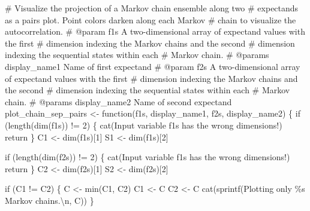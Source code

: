 \documentclass[
  letterpaper,
  DIV=11,
  numbers=noendperiod]{scrartcl}
\newenvironment{Shaded}{\begin{snugshade}}{\end{snugshade}}
\newcommand{\CommentTok}[1]{\textcolor[rgb]{0.37,0.37,0.37}{#1}}
\newcommand{\ControlFlowTok}[1]{\textcolor[rgb]{0.00,0.23,0.31}{#1}}
\newcommand{\DecValTok}[1]{\textcolor[rgb]{0.68,0.00,0.00}{#1}}
\newcommand{\FunctionTok}[1]{\textcolor[rgb]{0.28,0.35,0.67}{#1}}
\newcommand{\NormalTok}[1]{\textcolor[rgb]{0.00,0.23,0.31}{#1}}
\newcommand{\OtherTok}[1]{\textcolor[rgb]{0.00,0.23,0.31}{#1}}
\newcommand{\SpecialCharTok}[1]{\textcolor[rgb]{0.37,0.37,0.37}{#1}}
\newcommand{\StringTok}[1]{\textcolor[rgb]{0.13,0.47,0.30}{#1}}
\begin{document}
\begin{Shaded}
\begin{Highlighting}[]
\CommentTok{\# Visualize the projection of a Markov chain ensemble along two }
\CommentTok{\# expectands as a pairs plot.  Point colors darken along each Markov }
\CommentTok{\# chain to visualize the autocorrelation.}
\CommentTok{\# @param f1s A two{-}dimensional array of expectand values with the first }
\CommentTok{\#            dimension indexing the Markov chains and the second }
\CommentTok{\#            dimension indexing the sequential states  within each }
\CommentTok{\#            Markov chain.}
\CommentTok{\# @params display\_name1 Name of first expectand}
\CommentTok{\# @param f2s A two{-}dimensional array of expectand values with the first }
\CommentTok{\#            dimension indexing the Markov chains and the second }
\CommentTok{\#            dimension indexing the sequential states  within each }
\CommentTok{\#            Markov chain.}
\CommentTok{\# @params display\_name2 Name of second expectand}
\NormalTok{plot\_chain\_sep\_pairs }\OtherTok{\textless{}{-}} \ControlFlowTok{function}\NormalTok{(f1s, display\_name1,}
\NormalTok{                                 f2s, display\_name2) \{}
  \ControlFlowTok{if}\NormalTok{ (}\FunctionTok{length}\NormalTok{(}\FunctionTok{dim}\NormalTok{(f1s)) }\SpecialCharTok{!=} \DecValTok{2}\NormalTok{) \{}
    \FunctionTok{cat}\NormalTok{(}\StringTok{\textquotesingle{}Input variable \textasciigrave{}f1s\textasciigrave{} has the wrong dimensions!\textquotesingle{}}\NormalTok{)}
\NormalTok{    return}
\NormalTok{  \}}
\NormalTok{  C1 }\OtherTok{\textless{}{-}} \FunctionTok{dim}\NormalTok{(f1s)[}\DecValTok{1}\NormalTok{]}
\NormalTok{  S1 }\OtherTok{\textless{}{-}} \FunctionTok{dim}\NormalTok{(f1s)[}\DecValTok{2}\NormalTok{]}

  \ControlFlowTok{if}\NormalTok{ (}\FunctionTok{length}\NormalTok{(}\FunctionTok{dim}\NormalTok{(f2s)) }\SpecialCharTok{!=} \DecValTok{2}\NormalTok{) \{}
    \FunctionTok{cat}\NormalTok{(}\StringTok{\textquotesingle{}Input variable \textasciigrave{}f1s\textasciigrave{} has the wrong dimensions!\textquotesingle{}}\NormalTok{)}
\NormalTok{    return}
\NormalTok{  \}}
\NormalTok{  C2 }\OtherTok{\textless{}{-}} \FunctionTok{dim}\NormalTok{(f2s)[}\DecValTok{1}\NormalTok{]}
\NormalTok{  S2 }\OtherTok{\textless{}{-}} \FunctionTok{dim}\NormalTok{(f2s)[}\DecValTok{2}\NormalTok{]}
  
  \ControlFlowTok{if}\NormalTok{ (C1 }\SpecialCharTok{!=}\NormalTok{ C2) \{}
\NormalTok{    C }\OtherTok{\textless{}{-}} \FunctionTok{min}\NormalTok{(C1, C2)}
\NormalTok{    C1 }\OtherTok{\textless{}{-}}\NormalTok{ C}
\NormalTok{    C2 }\OtherTok{\textless{}{-}}\NormalTok{ C}
    \FunctionTok{cat}\NormalTok{(}\FunctionTok{sprintf}\NormalTok{(}\StringTok{\textquotesingle{}Plotting only \%s Markov chains.}\SpecialCharTok{\textbackslash{}n}\StringTok{\textquotesingle{}}\NormalTok{, C))}
\NormalTok{  \}}


\end{Highlighting}
\end{Shaded}
\end{document}
